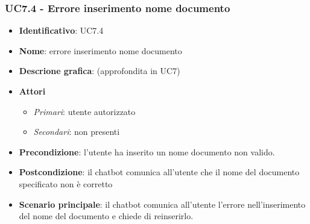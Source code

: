 \subsubsection{UC7.4 - Errore inserimento nome documento}
\begin{itemize}
    \item \textbf{Identificativo}: UC7.4
    \item \textbf{Nome}: errore inserimento nome documento
    \item \textbf{Descrione grafica}: (approfondita in UC7)
    \item \textbf{Attori}
 \begin{itemize} 
    \item \textit{Primari}: utente autorizzato
    \item \textit{Secondari}: non presenti
 \end{itemize}
 \item \textbf{Precondizione}: l'utente ha inserito un nome documento non valido.
 \item \textbf{Postcondizione}:  il chatbot comunica all'utente che il nome del documento specificato non è corretto
 \item \textbf{Scenario principale}: il chatbot comunica all'utente l'errore nell'inserimento del nome del documento e chiede di reinserirlo.
\end{itemize}